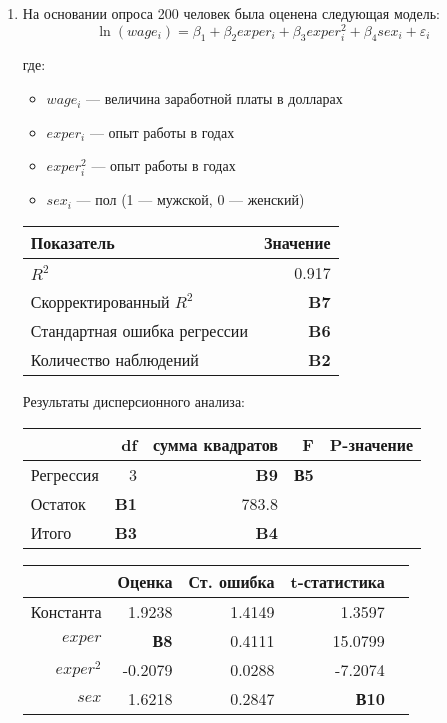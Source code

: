 \documentclass[12pt]{article}\usepackage[]{graphicx}\usepackage[svgnames]{xcolor}
\def \e{\varepsilon}
\begin{document}
\begin{enumerate}



\item На основании опроса 200 человек была оценена следующая модель:
\[
\ln(wage_i)=\beta_1 + \beta_2 exper_i + \beta_3 exper^2_i + \beta_4 sex_i + \e_i
\]

где:
\begin{itemize}
\item $wage_i$ — величина заработной платы в долларах
\item $exper_i$ — опыт работы в годах
\item $exper^2_i$ — опыт работы в годах
\item $sex_i$ — пол (1 — мужской, 0 — женский)
\end{itemize}

\begin{tabular}{lr} \toprule
Показатель & Значение \\
\midrule
$R^2$                        & 0.917 \\
Скорректированный $R^2$      & \textbf{B7} \\
Стандартная ошибка регрессии & \textbf{B6} \\
Количество наблюдений        & \textbf{B2} \\
\bottomrule
\end{tabular}

Результаты дисперсионного анализа:

\begin{tabular}{lrrrr} \toprule
            &  df           & сумма квадратов & F           & P-значение \\
\midrule
Регрессия   & 3            & \textbf{B9}     & \textbf{В5}  &   \\
Остаток     & \textbf{B1}  &  783.8  &              &       \\
Итого       & \textbf{B3}  & \textbf{B4}     &              &       \\
\bottomrule
\end{tabular}


\begin{table}[ht]
\centering
\begin{tabular}{rrrrr}
  \hline
 & Оценка & Ст. ошибка & t-статистика  \\
  \hline
Константа & 1.9238 & 1.4149 & 1.3597 \\
  $exper$ & \textbf{В8} & 0.4111 & 15.0799  \\
  $exper^2$ & -0.2079 & 0.0288 & -7.2074  \\
  $sex$ & 1.6218 & 0.2847 & \textbf{В10}  \\
   \hline
\end{tabular}
\end{table}




\end{enumerate}
\end{document}
